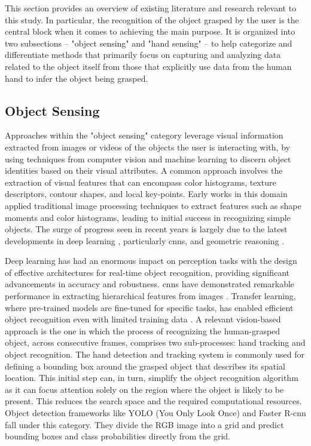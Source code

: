 This section provides an overview of existing literature and research relevant to this study. In particular, the recognition of the object grasped by the user is the central block when it comes to achieving the main purpose. It is organized into two subsections – "object sensing" and "hand sensing" – to help categorize and differentiate methods that primarily focus on capturing and analyzing data related to the object itself from those that explicitly use data from the human hand to infer the object being grasped. 

\subsection{Object Sensing}
Approaches within the "object sensing" category leverage visual information extracted from images or videos of the objects the user is interacting with, by using techniques from computer vision and machine learning to discern object identities based on their visual attributes. A common approach involves the extraction of visual features that can encompass color histograms, texture descriptors, contour shapes, and local key-points. Early works in this domain \cite{Taubin1992,Mindru1999,Sarfraz2006} applied traditional image processing techniques to extract features such as shape moments and color histograms, leading to initial success in recognizing simple objects. The surge of progress seen in recent years is largely due to the latest developments in deep learning \cite{Wu2020}, particularly \acs{cnn}s, and geometric reasoning \cite{Barabanau2020}.

Deep learning has had an enormous impact on perception tasks with the design of effective architectures for real-time object recognition, providing significant advancements in accuracy and robustness. \acs{cnn}s have demonstrated remarkable performance in extracting hierarchical features from images \cite{Ren2017}. Transfer learning, where pre-trained models are fine-tuned for specific tasks, has enabled efficient object recognition even with limited training data \cite{Zhuang2021}. A relevant vision-based approach is the one in which the process of recognizing the human-grasped object, across consecutive frames, comprises two sub-processes: hand tracking and object recognition. The hand detection and tracking system is commonly used for defining a bounding box around the grasped object that describes its spatial location. This initial step can, in turn, simplify the object recognition algorithm as it can focus attention solely on the region where the object is likely to be present. This reduces the search space and the required computational resources. Object detection frameworks like YOLO (You Only Look Once) and Faster R-\acs{cnn} fall under this category. They divide the RGB image into a grid and predict bounding boxes and class probabilities directly from the grid.  


